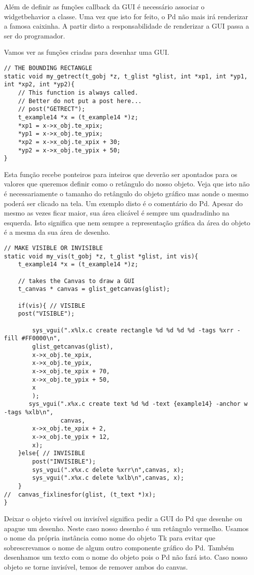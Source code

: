 Além de definir as funções callback da GUI é necessário associar o widgetbehavior a classe. Uma vez que isto
for feito, o Pd não mais irá renderizar a famosa caixinha. A partir disto a responsabilidade de renderizar a 
GUI passa a ser do programador.

Vamos ver as funções criadas para desenhar uma GUI.

\begin{lstlisting}
// THE BOUNDING RECTANGLE
static void my_getrect(t_gobj *z, t_glist *glist, int *xp1, int *yp1, int *xp2, int *yp2){
	// This function is always called. 
	// Better do not put a post here...
	// post("GETRECT");
	t_example14 *x = (t_example14 *)z;
 	*xp1 = x->x_obj.te_xpix;
 	*yp1 = x->x_obj.te_ypix;
 	*xp2 = x->x_obj.te_xpix + 30;
 	*yp2 = x->x_obj.te_ypix + 50;
}
\end{lstlisting}

Esta função recebe ponteiros para inteiros que deverão ser apontados para os valores que queremos definir como
o retângulo do nosso objeto. Veja que isto não é necessariamente o tamanho do retângulo do objeto gráfico mas aonde o mesmo
poderá ser clicado na tela. Um exemplo disto é o comentário do Pd. Apesar do mesmo as vezes ficar maior, sua área 
clicável é sempre um quadradinho na esquerda. Isto significa que nem sempre a representação gráfica da área do objeto
é a mesma da sua área de desenho.

\begin{lstlisting}
// MAKE VISIBLE OR INVISIBLE
static void my_vis(t_gobj *z, t_glist *glist, int vis){
	t_example14 *x = (t_example14 *)z;

	// takes the Canvas to draw a GUI
	t_canvas * canvas = glist_getcanvas(glist);

	if(vis){ // VISIBLE
	post("VISIBLE");

        sys_vgui(".x%lx.c create rectangle %d %d %d %d -tags %xrr -fill #FF0000\n",
		glist_getcanvas(glist),
		x->x_obj.te_xpix,
		x->x_obj.te_ypix,
		x->x_obj.te_xpix + 70,
		x->x_obj.te_ypix + 50,
		x
		);
       sys_vgui(".x%x.c create text %d %d -text {example14} -anchor w  -tags %xlb\n",
                canvas,
		x->x_obj.te_xpix + 2,
		x->x_obj.te_ypix + 12,
		x);
	}else{ // INVISIBLE
		post("INVISIBLE");
		sys_vgui(".x%x.c delete %xrr\n",canvas, x);
		sys_vgui(".x%x.c delete %xlb\n",canvas, x);
	}
//	canvas_fixlinesfor(glist, (t_text *)x);
}\end{lstlisting}

Deixar o objeto visível ou invisível significa pedir a GUI do Pd que desenhe ou apague um desenho.
Neste caso nosso desenho é um retângulo vermelho. Usamos o nome da própria instância como nome do
objeto Tk para evitar que sobrescrevamos o nome de algum outro componente gráfico do Pd. Também desenhamos
um texto com o nome do objeto pois o Pd não fará isto. Caso nosso objeto se torne invisível, temos de
remover ambos do canvas.

